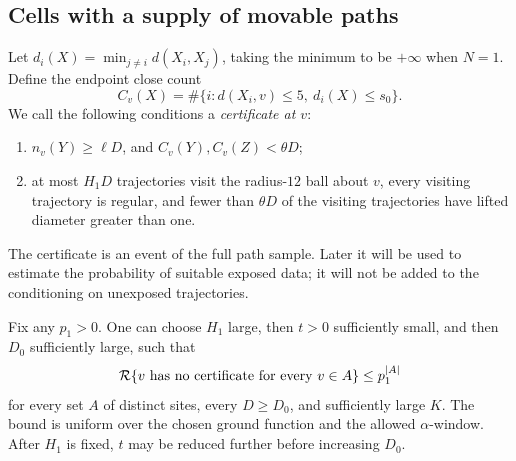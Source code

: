 \subsection{Cells with a supply of movable paths}

Let $d_i(X)=\min_{j\ne i}d(X_i,X_j)$, taking the minimum to be
$+\infty$ when $N=1$.  Define the endpoint close count
\[
 C_v(X)=\#\{i:d(X_i,v)\le5,\ d_i(X)\le s_0\}.
\]
We call the following conditions a \emph{certificate at $v$}:
\begin{enumerate}[label=\textup{(\roman*)}]
 \item $n_v(Y)\ge\ell D$, and $C_v(Y),C_v(Z)<\theta D$;
 \item at most $H_1D$ trajectories visit the radius-$12$ ball about
 $v$, every visiting trajectory is regular, and fewer than $\theta D$
 of the visiting trajectories have lifted diameter greater than one.
\end{enumerate}
The certificate is an event of the full path sample.  Later it will
be used to estimate the probability of suitable exposed data; it
will not be added to the conditioning on unexposed trajectories.

\begin{proposition}\label{path:certificates}
Fix any $p_1>0$.  One can choose $H_1$ large, then $t>0$ sufficiently
small, and then $D_0$ sufficiently large, such that
\begin{equation}\label{path:certificate-bound}
 \mathcal R\{v\text{ has no certificate for every }v\in A\}
 \le p_1^{|A|}
\end{equation}
for every set $A$ of distinct sites, every $D\ge D_0$, and sufficiently
large $K$.  The bound is uniform over the chosen ground function and
the allowed $\alpha$-window.  After $H_1$ is fixed, $t$ may be reduced
further before increasing $D_0$.
\end{proposition}

